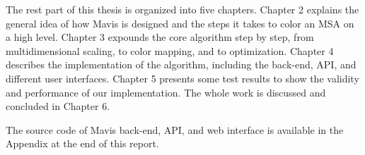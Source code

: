 The rest part of this thesis is organized into five chapters. Chapter 2 explains the general idea of how Mavis is designed and the steps it takes to color an MSA on a high level. Chapter 3 expounds the core algorithm step by step, from multidimensional scaling, to color mapping, and to optimization. Chapter 4 describes the implementation of the algorithm, including the back-end, API, and different user interfaces. Chapter 5 presents some test results to show the validity and performance of our implementation. The whole work is discussed and concluded in Chapter 6.

The source code of Mavis back-end, API, and web interface is available in the Appendix at the end of this report.

